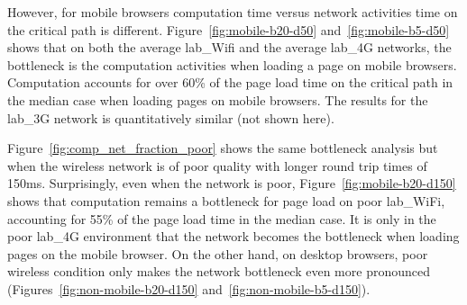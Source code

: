 \noindent However, for mobile browsers computation time versus network activities time on the critical path  is different. Figure~\ref{fig:mobile-b20-d50} and~\ref{fig:mobile-b5-d50} shows that on both the average lab\_Wifi and the average lab\_4G networks, the bottleneck is the computation activities when loading a page on mobile browsers. Computation accounts for over 60\% of the page load time on the critical path in the median case when loading pages on mobile browsers. The results for the lab\_3G network is quantitatively similar (not shown here).

\noindent Figure~\ref{fig:comp_net_fraction_poor} shows the same bottleneck analysis but when the wireless network is of poor quality with longer round trip times of 150ms. Surprisingly, even when the network is poor, Figure~\ref{fig:mobile-b20-d150} shows that computation remains a bottleneck for page load on poor lab\_WiFi, accounting for 55\% of the page load time in the median case. It is only in the poor lab\_4G environment that the network becomes the bottleneck when loading pages on the mobile browser. On the other hand, on desktop browsers, poor wireless condition only makes the network bottleneck even more pronounced (Figures~\ref{fig:non-mobile-b20-d150} and~\ref{fig:non-mobile-b5-d150}).
